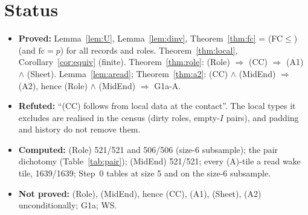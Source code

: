\documentclass[11pt]{article}
\theoremstyle{definition}\newtheorem{definition}[theorem]{Definition}\newtheorem{remark}[theorem]{Remark}
\begin{document}
\section*{Status}
\begin{itemize}
\item \textbf{Proved:} Lemma~\ref{lem:U}, Lemma~\ref{lem:dinv}, Theorem~\ref{thm:fc} = (FC$\le$) (and $\mathrm{fc}=p$) for all records and roles. Theorem~\ref{thm:local}, Corollary~\ref{cor:equiv} (finite). Theorem~\ref{thm:role}: (Role) $\Rightarrow$ (CC) $\Rightarrow$ (A1) $\wedge$ (Sheet). Lemma~\ref{lem:aread}; Theorem~\ref{thm:a2}: (CC) $\wedge$ (MidEnd) $\Rightarrow$ (A2), hence (Role) $\wedge$ (MidEnd) $\Rightarrow$ G1a-A.
\item \textbf{Refuted:} ``(CC) follows from local data at the contact''. The local types it excludes are realised in the census (dirty roles, empty-$I$ pairs), and padding and history do not remove them.
\item \textbf{Computed:} (Role) 521/521 and 506/506 (size-6 subsample); the pair dichotomy (Table~\ref{tab:pair}); (MidEnd) 521/521; every (A)-tile a read wake tile, 1639/1639; Step~0 tables at size 5 and on the size-6 subsample.
\item \textbf{Not proved:} (Role), (MidEnd), hence (CC), (A1), (Sheet), (A2) unconditionally; G1a; WS.
\end{itemize}
\end{document}
